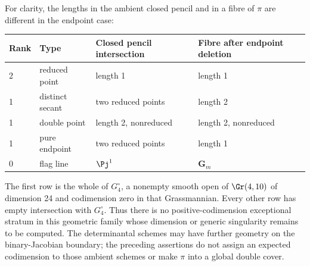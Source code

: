 For clarity, the lengths in the ambient closed pencil and in a fibre
of \(\pi\) are different in the endpoint case:
\begin{center}
\begin{tabular}{llll}
\toprule
Rank & Type & Closed pencil intersection & Fibre after endpoint deletion\\
\midrule
2 & reduced point & length 1 & length 1\\
1 & distinct secant & two reduced points & length 2\\
1 & double point & length 2, nonreduced & length 2, nonreduced\\
1 & pure endpoint & two reduced points & length 1\\
0 & flag line & \(\Pj^1\) & \(\mathbf G_m\)\\
\bottomrule
\end{tabular}
\end{center}
The first row is the whole of \(G_4^\circ\), a nonempty smooth
open of \(\Gr(4,10)\) of dimension 24 and codimension zero in
that Grassmannian.  Every other row has empty intersection with
\(G_4^\circ\).  Thus there is no positive-codimension exceptional
stratum in this geometric family whose dimension or generic
singularity remains to be computed.  The determinantal schemes may
have further geometry on the binary-Jacobian boundary; the preceding
assertions do not assign an expected codimension to those ambient
schemes or make \(\pi\) into a global double cover.
